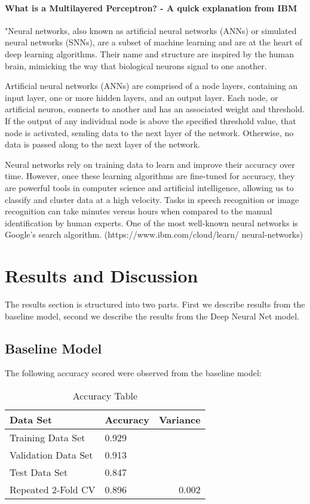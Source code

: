 \documentclass[fleqn,10pt]{SelfArx} %
\begin{document}
\paragraph{What is a Multilayered Perceptron? - A quick explanation from IBM} "Neural networks, also known as artificial neural networks (ANNs) or simulated neural networks (SNNs), are a subset of machine learning and are at the heart of deep learning algorithms. Their name and structure are inspired by the human brain, mimicking the way that biological neurons signal to one another.

Artificial neural networks (ANNs) are comprised of a node layers, containing an input layer, one or more hidden layers, and an output layer. Each node, or artificial neuron, connects to another and has an associated weight and threshold. If the output of any individual node is above the specified threshold value, that node is activated, sending data to the next layer of the network. Otherwise, no data is passed along to the next layer of the network.

Neural networks rely on training data to learn and improve their accuracy over time. However, once these learning algorithms are fine-tuned for accuracy, they are powerful tools in computer science and artificial intelligence, allowing us to classify and cluster data at a high velocity. Tasks in speech recognition or image recognition can take minutes versus hours when compared to the manual identification by human experts. One of the most well-known neural networks is Google’s search algorithm. (https://www.ibm.com/cloud/learn/ \newline neural-networks)

\section{Results and Discussion}
The results section is structured into two parts. First we describe results from the baseline model, second we describe the results from the Deep Neural Net model.

\subsection{Baseline Model}
The following accuracy scored were observed from the baseline model:

\begin{table}[hbt]
	\caption{Accuracy Table}
	\centering
	\begin{tabular}{llr}
		\toprule
		 Data Set & Accuracy & Variance\\
		\midrule
		Training Data Set & 0.929\\
		Validation Data Set & 0.913\\
		Test Data Set & 0.847 \\
		Repeated 2-Fold CV & 0.896 & 0.002\\
		\bottomrule
	\end{tabular}
	\label{tab:label}
\end{table}
\end{document}
